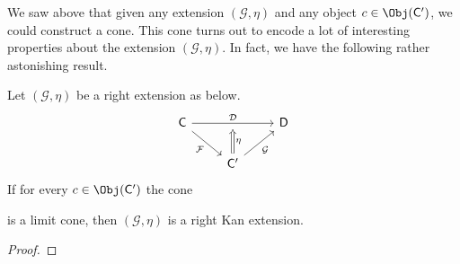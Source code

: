 \documentclass[notes.tex]{subfiles}
\begin{document}
We saw above that given any extension $(\mathcal{G}, \eta)$ and any object $c \in \Obj(\mathsf{C}')$, we could construct a cone. This cone turns out to encode a lot of interesting properties about the extension $(\mathcal{G}, \eta)$. In fact, we have the following rather astonishing result.

\begin{theorem}
  Let $(\mathcal{G}, \eta)$ be a right extension as below.
  \begin{equation*}
    \begin{tikzcd}
      \mathsf{C}
      \arrow[dr, swap, "\mathcal{F}"]
      \arrow[rr, "\mathcal{D}", ""'{name=U}]
      && \mathsf{D}
      \\
      & \mathsf{C'}
      \arrow[ur, swap, "\mathcal{G}"]
      \arrow[d, to=U, Rightarrow, swap, "\eta"] 
    \end{tikzcd}
  \end{equation*}
  If for every $c \in \Obj(\mathsf{C'})$ the cone 
  
  is a limit cone, then $(\mathcal{G}, \eta)$ is a right Kan extension.
\end{theorem}
\begin{proof}

\end{proof}
\end{document}
